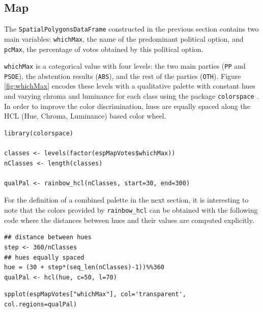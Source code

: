 \documentclass[smallroyalvopaper]{memoir}
\begin{document}
\subsection{Map}
\label{sec-1-2}
\label{sec:map}
The \texttt{SpatialPolygonsDataFrame} constructed in the previous section
contains two main variables: \texttt{whichMax}, the name of the predominant
political option, and \texttt{pcMax}, the percentage of votes obtained by
this political option.

\texttt{whichMax} is a categorical value with four levels: the two main
parties (\texttt{PP} and \texttt{PSOE}), the abstention results (\texttt{ABS}), and the
rest of the parties (\texttt{OTH}). Figure \ref{fig:whichMax} encodes these levels
with a qualitative palette with constant hues and varying chroma and
luminance for each class using the package \texttt{colorspace}
\cite{Zeileis.Hornik.ea2009}. In order to improve the color
discrimination, hues are equally spaced along the HCL (Hue, Chroma,
Luminance) based color wheel.

\lstset{language=R,numbers=none}
\begin{lstlisting}
library(colorspace)  

classes <- levels(factor(espMapVotes$whichMax))
nClasses <- length(classes)

qualPal <- rainbow_hcl(nClasses, start=30, end=300)
\end{lstlisting}

For the definition of a combined palette in the next section, it is
interesting to note that the colors provided by \texttt{rainbow\_hcl} can be
obtained with the following code where the distances between hues and
their values are computed explicitly.
\lstset{language=R,numbers=none}
\begin{lstlisting}
## distance between hues
step <- 360/nClasses 
## hues equally spaced
hue = (30 + step*(seq_len(nClasses)-1))%%360 
qualPal <- hcl(hue, c=50, l=70)
\end{lstlisting}

\lstset{language=R,numbers=none}
\begin{lstlisting}
spplot(espMapVotes["whichMax"], col='transparent', col.regions=qualPal)
\end{lstlisting}
\end{document}
